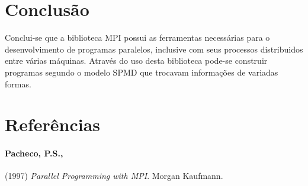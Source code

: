 \documentclass[11pt,a4paper,onecolumn]{article}
\begin{document}
\section{Conclusão}
Conclui-se que a biblioteca MPI possui as ferramentas necessárias para o desenvolvimento de programas paralelos, inclusive com seus processos distribuidos entre várias máquinas.
Através do uso desta biblioteca pode-se construir programas segundo o modelo SPMD que trocavam informações de variadas formas.

\section{Referências}
\paragraph{Pacheco, P.S.,} (1997) \textit{Parallel Programming with MPI}. Morgan Kaufmann.
\end{document}
